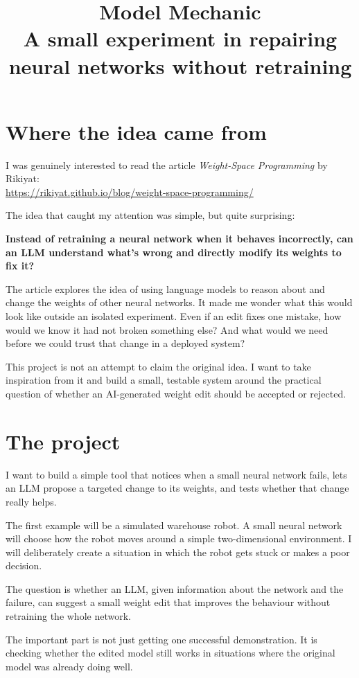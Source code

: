 \documentclass[11pt,a4paper]{article}
\title{Model Mechanic\\\large A small experiment in repairing neural networks without retraining}
\author{}
\date{}
\begin{document}
\maketitle

\section*{Where the idea came from}
I was genuinely interested to read the article \emph{Weight-Space Programming} by Rikiyat:\\
\url{https://rikiyat.github.io/blog/weight-space-programming/}

The idea that caught my attention was simple, but quite surprising:

\textbf{Instead of retraining a neural network when it behaves incorrectly, can an LLM understand what's wrong and directly modify its weights to fix it?}

The article explores the idea of using language models to reason about and change the weights of other neural networks. It made me wonder what this would look like outside an isolated experiment. Even if an edit fixes one mistake, how would we know it had not broken something else? And what would we need before we could trust that change in a deployed system?

This project is not an attempt to claim the original idea. I want to take inspiration from it and build a small, testable system around the practical question of whether an AI-generated weight edit should be accepted or rejected.

\section*{The project}
I want to build a simple tool that notices when a small neural network fails, lets an LLM propose a targeted change to its weights, and tests whether that change really helps.

The first example will be a simulated warehouse robot. A small neural network will choose how the robot moves around a simple two-dimensional environment. I will deliberately create a situation in which the robot gets stuck or makes a poor decision.

The question is whether an LLM, given information about the network and the failure, can suggest a small weight edit that improves the behaviour without retraining the whole network.

The important part is not just getting one successful demonstration. It is checking whether the edited model still works in situations where the original model was already doing well.
\end{document}
